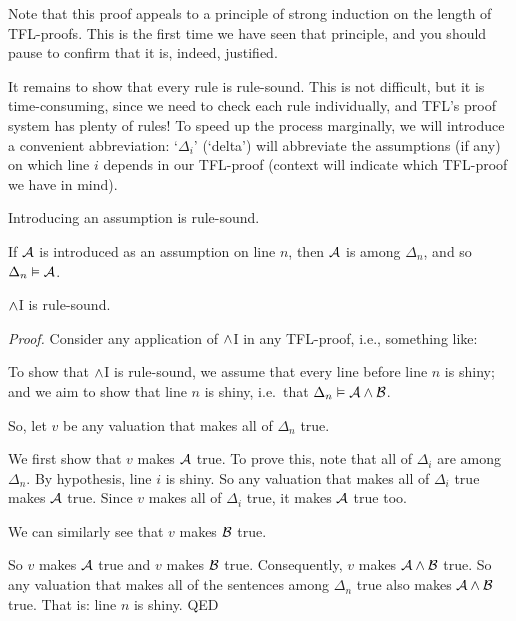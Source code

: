 Note that this proof appeals to a principle of strong induction on the length of TFL-proofs. This is the first time we have seen that principle, and you should pause to confirm that it is, indeed, justified.

It remains to show that every rule is rule-sound. This is not difficult, but it is time-consuming, since we need to check each rule individually, and TFL's proof system has plenty of rules! To speed up the process marginally, we will introduce a convenient abbreviation: `$\Delta_i$' (`delta') will abbreviate the assumptions (if any) on which line $i$ depends in our TFL-proof (context will indicate which TFL-proof we have in mind).

\begin{factoidboxe}Introducing an assumption is rule-sound.
\end{factoidboxe}

If $\mathcal{A}$ is introduced as an assumption on line $n$, then $\mathcal{A}$ is among $\Delta_n$, and so $\Delta_n \vDash \mathcal{A}$.

\begin{factoidboxe}$\wedge$I is rule-sound.
\end{factoidboxe}

\emph{Proof.} Consider any application of $\wedge$I in any TFL-proof, i.e., something like:
\begin{fitchproof}
	 
\end{fitchproof}\noindent
To show that $\wedge$I is rule-sound, we assume that every line before line $n$ is shiny; and we aim to show that line $n$ is shiny, i.e.\ that $\Delta_n \vDash \mathcal{A} \wedge \mathcal{B}$. 

So, let $v$ be any valuation that makes all of $\Delta_{n}$ true. 

We first show that $v$ makes $\mathcal{A}$ true. To prove this, note that all of $\Delta_i$ are among $\Delta_{n}$. By hypothesis, line $i$ is shiny. So any valuation that makes all of $\Delta_i$ true makes $\mathcal{A}$ true. Since $v$ makes all of $\Delta_i$ true, it makes $\mathcal{A}$ true too.

We can similarly see that $v$ makes $\mathcal{B}$ true. 

So $v$ makes $\mathcal{A}$ true and $v$ makes $\mathcal{B}$ true. Consequently, $v$ makes $\mathcal{A}\wedge\mathcal{B}$ true. So any valuation that makes all of the sentences among $\Delta_{n}$ true also makes $\mathcal{A} \wedge \mathcal{B}$ true. That is: line $n$ is shiny. QED


